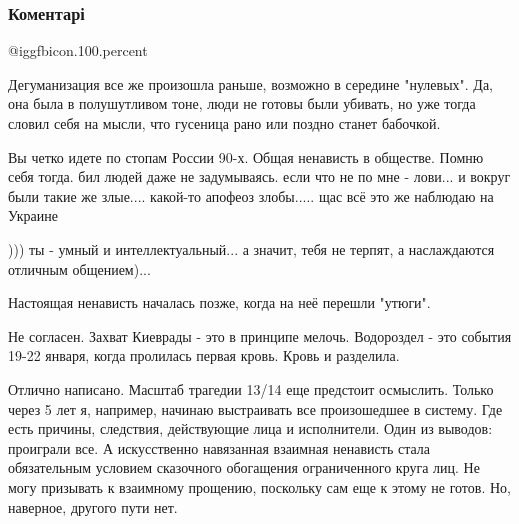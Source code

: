  
 
 
 
 
\subsubsection{Коментарі}

\begin{itemize} %
 @igg{fbicon.100.percent} 


Дегуманизация все же произошла раньше, возможно в середине "нулевых". Да, она
была в полушутливом тоне, люди не готовы были убивать, но уже тогда словил себя
на мысли, что гусеница рано или поздно станет бабочкой.


Вы четко идете по стопам России 90-х. Общая ненависть в обществе. Помню себя
тогда. бил людей даже не задумываясь. если что не по мне - лови... и вокруг
были такие же злые.... какой-то апофеоз злобы..... щас всё это же наблюдаю на
Украине


))) ты - умный и интеллектуальный... а значит, тебя не терпят, а наслаждаются отличным общением)...

Настоящая ненависть началась позже, когда на неё перешли "утюги".


Не согласен. Захват Киеврады - это в принципе мелочь. Водороздел - это события
19-22 января, когда пролилась первая кровь. Кровь и разделила.


Отлично написано. Масштаб трагедии 13/14 еще предстоит осмыслить. Только через
5 лет я, например, начинаю выстраивать все произошедшее в систему. Где есть
причины, следствия, действующие лица и исполнители. Один из выводов: проиграли
все. А искусственно навязанная взаимная ненависть стала обязательным условием
сказочного обогащения ограниченного круга лиц. Не могу призывать к взаимному
прощению, поскольку сам еще к этому не готов. Но, наверное, другого пути нет.


\end{itemize}
